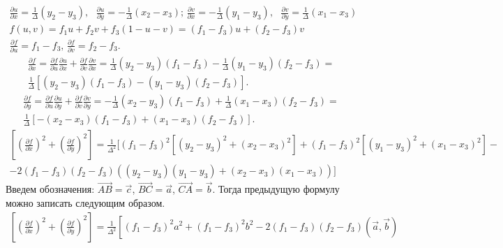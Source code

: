 \documentclass{article}
\begin{document}
\begin{enumerate}
\begin{multline*}
        \frac{\partial u}{\partial x} = \frac{1}{\Delta}(y_2 - y_3), \mbox{ } \frac{\partial u}{\partial y} = -\frac{1}{\Delta}(x_2 - x_3) \mbox{; }
        \frac{\partial v}{\partial x} = -\frac{1}{\Delta}(y_1 - y_3), \mbox{ } \frac{\partial v}{\partial y} = \frac{1}{\Delta}(x_1 - x_3) \\
        f(u, v) = f_1 u + f_2 v + f_3(1-u-v) = (f_1 - f_3) u + (f_2 - f_3) v \\
        \frac{\partial f}{\partial u} = f_1 - f_3 \mbox{, } \frac{\partial f}{\partial v} = f_2 - f_3. 
    \end{multline*}
    \begin{multline*}
        \frac{\partial f}{\partial x} = \frac{\partial f}{\partial u} \frac{\partial u}{\partial x} + \frac{\partial f}{\partial v} \frac{\partial v}{\partial x} = 
            \frac{1}{\Delta}(y_2 - y_3)(f_1 - f_3) - \frac{1}{\Delta}(y_1 - y_3)(f_2 - f_3) = \\
            \frac{1}{\Delta}\left[(y_2 - y_3)(f_1 - f_3) - (y_1 - y_3)(f_2 - f_3)\right]. 
    \end{multline*}
    \begin{multline*}
        \frac{\partial f}{\partial y} = \frac{\partial f}{\partial u} \frac{\partial u}{\partial y} + \frac{\partial f}{\partial v} \frac{\partial v}{\partial y} = 
            -\frac{1}{\Delta}(x_2 - y_3)(f_1 - f_3) + \frac{1}{\Delta}(x_1 - x_3)(f_2 - f_3) = \\
            \frac{1}{\Delta}\left[-(x_2 - x_3)(f_1 - f_3) + (x_1 - x_3)(f_2 - f_3)\right]. 
    \end{multline*}
    \begin{multline*}
        \left[\left(\frac{\partial f}{\partial x}\right)^2 + \left(\frac{\partial f}{\partial y}\right)^2 \right] = 
        \frac{1}{\Delta^2} 
        [
            (f_1 - f_3)^2 [(y_2 - y_3)^2 + (x_2 - x_3)^2] + (f_1 - f_3)^2 [(y_1 - y_3)^2 + (x_1 - x_3)^2] - \\
            - 2 (f_1 - f_3)(f_2 - f_3)((y_2 - y_3)(y_1 - y_3) + (x_2 - x_3)(x_1 - x_3))
        ]
    \end{multline*}
    Введем обозначения: $\vec{AB} = \vec{c}$, $\vec{BC} = \vec{a}$, $\vec{CA} = \vec{b}$. Тогда предыдущую формулу можно записать следующим образом.
    \begin{multline*}
        \left[\left(\frac{\partial f}{\partial x}\right)^2 + \left(\frac{\partial f}{\partial y}\right)^2 \right] = 
        \frac{1}{\Delta^2} 
        \left[
            (f_1 - f_3)^2 a^2 + (f_1 - f_3)^2 b^2 - 2 (f_1 - f_3)(f_2 - f_3)(\vec{a}, \vec{b}) 

\end{multline*}
\end{enumerate}
\end{document}
